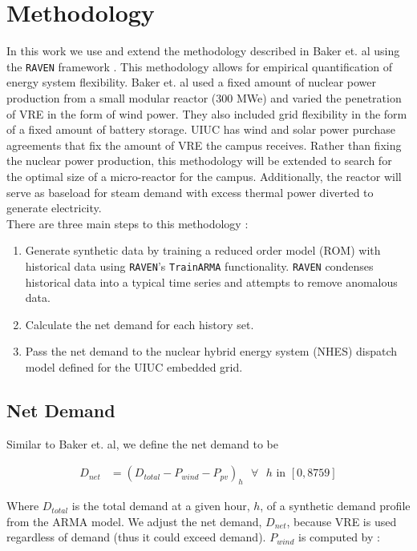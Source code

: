 \section{Methodology}

In this work we use and extend the methodology described in Baker et. al using the \texttt{RAVEN} framework \cite{baker_optimal_2018,alfonsi_raven_2016}. This methodology allows for empirical quantification of energy system flexibility. Baker et. al used a fixed amount of nuclear power production from a small modular reactor (300 MWe) and varied the penetration of VRE in the form of wind power. They also included grid flexibility in the form of a fixed amount of battery storage. UIUC has wind and solar power purchase agreements that fix the amount of VRE the campus receives. Rather than fixing the nuclear power production, this methodology will be extended to search for the optimal size of a micro-reactor for the campus. Additionally, the reactor will serve as baseload for steam demand with excess thermal power diverted to generate electricity.\\
There are three main steps to this methodology \cite{baker_optimal_2018}: 

\begin{enumerate}
	\item Generate synthetic data by training a reduced order model (ROM) with historical data using \texttt{RAVEN}'s \texttt{TrainARMA} functionality. \texttt{RAVEN} condenses historical data into a typical time series and attempts to remove anomalous data.
	\item Calculate the net demand for each history set.
	\item Pass the net demand to the nuclear hybrid energy system (NHES) dispatch model defined for the UIUC embedded grid. 
\end{enumerate}

\subsection{Net Demand}
Similar to Baker et. al, we define the net demand to be 


\begin{equation}
	\label{eqn:net-demand}
	\begin{split}
		D_{net} & = (D_{total} - P_{wind} - P_{pv})_h \text{ $\forall$ $h$ in } [0,8759]
	\end{split}
\end{equation}

Where $D_{total}$ is the total demand at a given hour, $h$, of a synthetic demand profile from the ARMA model. We adjust the net demand, $D_{net}$, because VRE is used regardless of demand (thus it could exceed demand). $P_{wind}$ is computed by \cite{garcia_nuclear_2015}:

